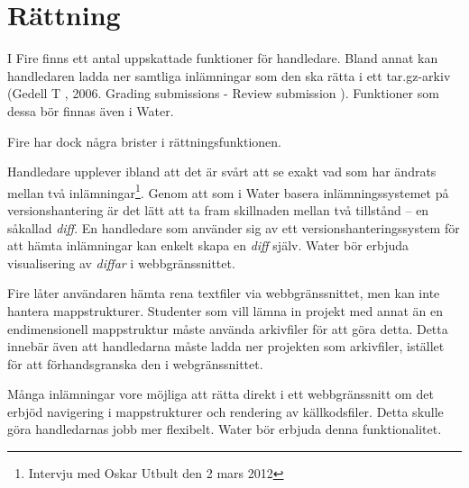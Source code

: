 \section{Rättning}

I Fire finns ett antal uppskattade funktioner för handledare. Bland annat kan handledaren ladda ner samtliga inlämningar som den ska rätta i ett tar.gz-arkiv (Gedell T , 2006. Grading submissions - Review submission ). Funktioner som dessa bör finnas även i Water.

Fire har dock några brister i rättningsfunktionen.

Handledare upplever ibland att det är svårt att se exakt vad som har ändrats mellan två inlämningar\footnote{Intervju med Oskar Utbult den 2 mars 2012}. Genom att som i Water basera inlämningssystemet på versionshantering är det lätt att ta fram skillnaden mellan två tillstånd – en såkallad \emph{diff}. En handledare som använder sig av ett versionshanteringssystem för att hämta inlämningar kan enkelt skapa en \emph{diff} själv. Water bör erbjuda visualisering av \emph{diffar} i webbgränssnittet.

Fire låter användaren hämta rena textfiler via webbgränssnittet, men kan inte hantera mappstrukturer. Studenter som vill lämna in projekt med annat än en endimensionell mappstruktur måste använda arkivfiler för att göra detta. Detta innebär även att handledarna måste ladda ner projekten som arkivfiler, istället för att förhandsgranska den i webgränssnittet.

Många inlämningar vore möjliga att rätta direkt i ett webbgränssnitt om det erbjöd navigering i mappstrukturer och rendering av källkodsfiler. Detta skulle göra handledarnas jobb mer flexibelt. Water bör erbjuda denna funktionalitet.

